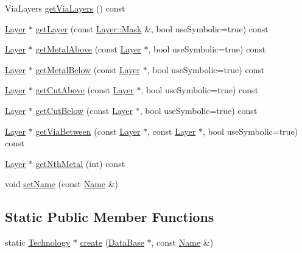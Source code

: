 \begin{DoxyCompactItemize}
\item 
Via\+Layers \hyperlink{classHurricane_1_1Technology_aacde973f6a02a232a01f3f618576e1ee}{get\+Via\+Layers} () const
\item 
\hyperlink{classHurricane_1_1Layer}{Layer} $\ast$ \hyperlink{classHurricane_1_1Technology_a2ab8d2c386bf3daeb2b93d92ecbac6b4}{get\+Layer} (const \hyperlink{classHurricane_1_1Layer_af5277c670637bd5d910237e7afe01a91}{Layer\+::\+Mask} \&, bool use\+Symbolic=true) const
\item 
\hyperlink{classHurricane_1_1Layer}{Layer} $\ast$ \hyperlink{classHurricane_1_1Technology_af5723b08c9d289ffef8159ac2ea71b74}{get\+Metal\+Above} (const \hyperlink{classHurricane_1_1Layer}{Layer} $\ast$, bool use\+Symbolic=true) const
\item 
\hyperlink{classHurricane_1_1Layer}{Layer} $\ast$ \hyperlink{classHurricane_1_1Technology_ae02123406c7362cc14413727e8689d5a}{get\+Metal\+Below} (const \hyperlink{classHurricane_1_1Layer}{Layer} $\ast$, bool use\+Symbolic=true) const
\item 
\hyperlink{classHurricane_1_1Layer}{Layer} $\ast$ \hyperlink{classHurricane_1_1Technology_ac7125a8eea871918e74bb295c56caceb}{get\+Cut\+Above} (const \hyperlink{classHurricane_1_1Layer}{Layer} $\ast$, bool use\+Symbolic=true) const
\item 
\hyperlink{classHurricane_1_1Layer}{Layer} $\ast$ \hyperlink{classHurricane_1_1Technology_a3ca39dccc7e19b404181f55777e1b933}{get\+Cut\+Below} (const \hyperlink{classHurricane_1_1Layer}{Layer} $\ast$, bool use\+Symbolic=true) const
\item 
\hyperlink{classHurricane_1_1Layer}{Layer} $\ast$ \hyperlink{classHurricane_1_1Technology_a8209708bc594a307ea39f15a39bbf196}{get\+Via\+Between} (const \hyperlink{classHurricane_1_1Layer}{Layer} $\ast$, const \hyperlink{classHurricane_1_1Layer}{Layer} $\ast$, bool use\+Symbolic=true) const
\item 
\hyperlink{classHurricane_1_1Layer}{Layer} $\ast$ \hyperlink{classHurricane_1_1Technology_a81a3f3e479aeb686c61a2d0fa2931f3b}{get\+Nth\+Metal} (int) const
\item 
void \hyperlink{classHurricane_1_1Technology_a247b75d5cbb85198cea9e5e609304cd0}{set\+Name} (const \hyperlink{classHurricane_1_1Name}{Name} \&)
\end{DoxyCompactItemize}
\subsection*{Static Public Member Functions}
\begin{DoxyCompactItemize}
\item 
static \hyperlink{classHurricane_1_1Technology}{Technology} $\ast$ \hyperlink{classHurricane_1_1Technology_a8fd65387c7fd6ba1396f905fadf20087}{create} (\hyperlink{classHurricane_1_1DataBase}{Data\+Base} $\ast$, const \hyperlink{classHurricane_1_1Name}{Name} \&)
\end{DoxyCompactItemize}


